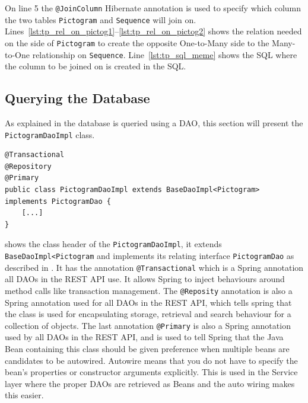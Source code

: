 On line 5 the \texttt{@JoinColumn} Hibernate annotation is used to specify which column the two tables \texttt{Pictogram} and \texttt{Sequence} will join on.
Lines~\ref{lst:tp_rel_on_pictog1}--\ref{lst:tp_rel_on_pictog2} shows the relation needed on the side of \texttt{Pictogram} to create the opposite One-to-Many side to the Many-to-One relationship on \texttt{Sequence}.
Line~\ref{lst:tp_sql_meme} shows the SQL where the column to be joined on is created in the SQL.
\subsection{Querying the Database}
As explained in  the database is queried using a DAO, this section will present the \texttt{PictogramDaoImpl} class.

\begin{lstlisting}[float, floatplacement=h, caption={The class header of the \texttt{PictogramDao}, along with its annotations. \texttt{[...]} denotes omitted code.},label={lst:pictogramDaoImpl}]
@Transactional
@Repository
@Primary
public class PictogramDaoImpl extends BaseDaoImpl<Pictogram> implements PictogramDao {
	[...]
}
\end{lstlisting}

 shows the class header of the \texttt{PictogramDaoImpl}, it extends \texttt{BaseDaoImpl<Pictogram} and implements its relating interface \texttt{PictogramDao} as described in .
It has the annotation \texttt{@Transactional} which is a Spring annotation all DAOs in the REST API use.
It allows Spring to inject behaviours around method calls like transaction management.
The \texttt{@Reposity} annotation is also a Spring annotation used for all DAOs in the REST API, which tells spring that the class is used for encapsulating storage, retrieval and search behaviour for a collection of objects.
The last annotation \texttt{@Primary} is also a Spring annotation used by all DAOs in the REST API, and is used to tell Spring that the Java Bean  containing this class should be given preference when multiple beans are candidates to be autowired.
Autowire means that you do not have to specify the bean's properties or constructor arguments explicitly.
This is used in the Service layer where the proper DAOs are retrieved as Beans and the auto wiring makes this easier.
\\

